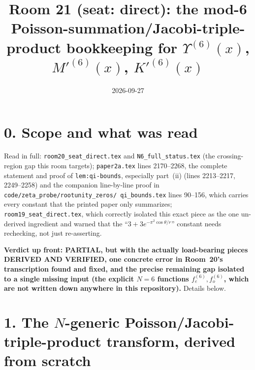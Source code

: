 \documentclass[11pt]{article}
\title{Room 21 (seat: direct): the mod-6 Poisson-summation/Jacobi-triple-product
bookkeeping for $\Upsilon^{(6)}(x)$, $M'^{(6)}(x)$, $K'^{(6)}(x)$}
\date{2026-09-27}
\begin{document}
\maketitle

\section*{0. Scope and what was read}

Read in full: \texttt{room20\_seat\_direct.tex} and \texttt{N6\_full\_status.tex} (the
crossing-region gap this room targets); \texttt{paper2a.tex} lines 2170--2268, the complete
statement and proof of \texttt{lem:qi-bounds}, especially part~(ii) (lines 2213--2217,
2249--2258) and the companion line-by-line proof in \texttt{code/zeta\_probe/rootunity\_zeros/
qi\_bounds.tex} lines 90--156, which carries every constant that the printed paper only
summarizes; \texttt{room19\_seat\_direct.tex}, which correctly isolated this exact piece as the
one un-derived ingredient and warned that the ``$3+3e^{-\pi^2\cos\theta/r}$'' constant needs
rechecking, not just re-asserting.

\textbf{Verdict up front: PARTIAL, but with the actually load-bearing pieces DERIVED AND
VERIFIED, one concrete error in Room~20's transcription found and fixed, and the precise
remaining gap isolated to a single missing input (the explicit $N=6$ functions $f_e^{(6)},
f_o^{(6)}$, which are not written down anywhere in this repository).} Details below.

\section*{1. The $N$-generic Poisson/Jacobi-triple-product transform, derived from scratch}
\end{document}
